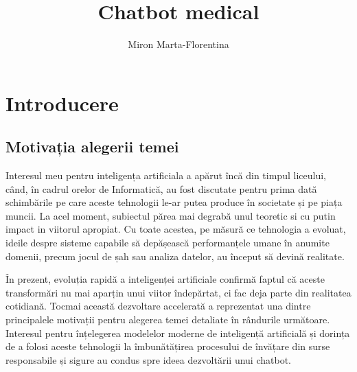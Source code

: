 \documentclass[12pt, a4paper, oneside, romanian]{teza-upb}
\begin{document}
\author{Miron Marta-Florentina}

\title{Chatbot medical}




\beforepreface
\listoffigures
\listoftables
{}
\afterpreface 

\chapter*{Introducere}
\section{Motivația alegerii temei}

Interesul meu pentru inteligența artificiala a apărut încă din timpul liceului, când, în cadrul orelor de Informatică, au fost discutate pentru prima dată schimbările pe care aceste tehnologii le-ar putea produce în societate și pe piața muncii. La acel moment, subiectul părea mai degrabă unul teoretic si cu putin impact in viitorul apropiat. Cu toate acestea, pe măsură ce tehnologia a evoluat, ideile despre sisteme capabile să depășească performanțele umane în anumite domenii, precum jocul de șah sau analiza datelor, au început să devină realitate.

În prezent, evoluția rapidă a inteligenței artificiale confirmă faptul că aceste transformări nu mai aparțin unui viitor îndepărtat, ci fac deja parte din realitatea cotidiană. Tocmai această dezvoltare accelerată a reprezentat una dintre principalele motivații pentru alegerea temei detaliate în rândurile următoare. Interesul pentru înțelegerea modelelor moderne de inteligență artificială și dorința de a folosi aceste tehnologii la îmbunătățirea procesului de învățare din surse responsabile și sigure au condus spre ideea dezvoltării unui chatbot.
\end{document}
